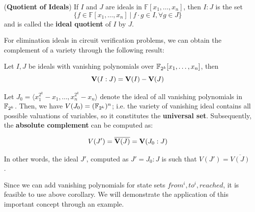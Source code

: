 \begin{Definition}
({\bf Quotient of Ideals}) If $I$ and $J$ are ideals in $\mathbb
  F[x_1, \dots, x_n]$, then $I:J$ is the set
  \begin{equation}
  \{f \in \mathbb F[x_1, \dots, x_n]\ |\ f\cdot g \in I, \forall g \in J\}\nonumber
  \end{equation}
and is called the {\bf ideal quotient} of $I$ by $J$.
\end{Definition}



For elimination ideals in circuit verification problems, we can obtain
the complement of a variety through the following result:

\begin{Theorem}
\label{thm:quotient}
Let $I, J$ be ideals with vanishing polynomials over ${\mathbb{F}}_{2^k}[x_1,\dots,x_n]$, then 
$${\bf V}(I:J) = {\bf V}(I) - {\bf V}(J)$$
\end{Theorem}


Let $J_0 = \langle x_1^{2^k} - x_1, \dots, x_n^{2^k} - x_n \rangle$
denote the ideal of all vanishing polynomials in ${\mathbb{F}}_{2^k}$. Then, we have
$V(J_0) = ({\mathbb{F}}_{2^k})^{n}$; i.e. the variety of vanishing ideal contains
all possible valuations of variables, so it constitutes the {\bf
  universal set}. Subsequently, the {\bf absolute complement} can be
computed as:

\begin{Corollary}
$$V(J') = \overline{{\bf V}(J)} = {\bf V}(J_0:J)$$

\end{Corollary}

In other words, the ideal $J'$, computed as $J' = J_0:J$ is such that
$V(J') =\overline{V(J)}$. 

Since we can add vanishing polynomials for state sets
$from^i, to^i, reached$, it is feasible to use above corollary. We
will demonstrate the application of this important concept through an
example. 
% 


